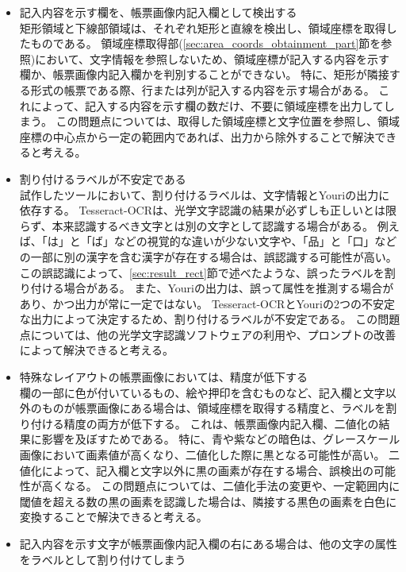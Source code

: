 \begin{itemize}
    \item 記入内容を示す欄を、帳票画像内記入欄として検出する\\
        矩形領域と下線部領域は、それぞれ矩形と直線を検出し、領域座標を取得したものである。
        領域座標取得部(\ref{sec:area_coords_obtainment_part}節を参照)において、文字情報を参照しないため、領域座標が記入する内容を示す欄か、帳票画像内記入欄かを判別することができない。
        特に、矩形が隣接する形式の帳票である際、行または列が記入する内容を示す場合がある。
        これによって、記入する内容を示す欄の数だけ、不要に領域座標を出力してしまう。
        この問題点については、取得した領域座標と文字位置を参照し、領域座標の中心点から一定の範囲内であれば、出力から除外することで解決できると考える。
    \item 割り付けるラベルが不安定である\\
        試作したツールにおいて、割り付けるラベルは、文字情報とYouriの出力に依存する。
        Tesseract-OCRは、光学文字認識の結果が必ずしも正しいとは限らず、本来認識するべき文字とは別の文字として認識する場合がある。
        例えば、「は」と「ば」などの視覚的な違いが少ない文字や、「品」と「口」などの一部に別の漢字を含む漢字が存在する場合は、誤認識する可能性が高い。
        この誤認識によって、\ref{sec:result_rect}節で述べたような、誤ったラベルを割り付ける場合がある。
        また、Youriの出力は、誤って属性を推測する場合があり、かつ出力が常に一定ではない。
        Tesseract-OCRとYouriの2つの不安定な出力によって決定するため、割り付けるラベルが不安定である。
        この問題点については、他の光学文字認識ソフトウェアの利用や、プロンプトの改善によって解決できると考える。
    \item 特殊なレイアウトの帳票画像においては、精度が低下する\\
        欄の一部に色が付いているもの、絵や押印を含むものなど、記入欄と文字以外のものが帳票画像にある場合は、領域座標を取得する精度と、ラベルを割り付ける精度の両方が低下する。
        これは、帳票画像内記入欄、二値化の結果に影響を及ぼすためである。
        特に、青や紫などの暗色は、グレースケール画像において画素値が高くなり、二値化した際に黒となる可能性が高い。
        二値化によって、記入欄と文字以外に黒の画素が存在する場合、誤検出の可能性が高くなる。
        この問題点については、二値化手法の変更や、一定範囲内に閾値を超える数の黒の画素を認識した場合は、隣接する黒色の画素を白色に変換することで解決できると考える。
    \item 記入内容を示す文字が帳票画像内記入欄の右にある場合は、他の文字の属性をラベルとして割り付けてしまう\\

\end{itemize}
